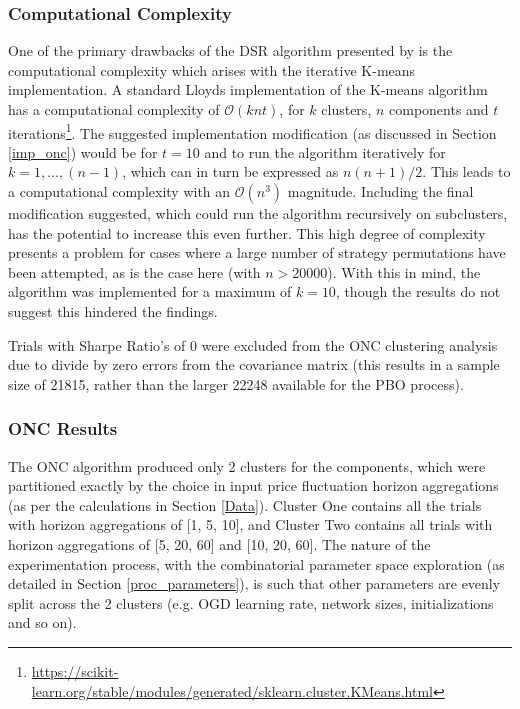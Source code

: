 \documentclass[a4paper,11pt,oneside]{article}
\theoremstyle{plain}
\theoremstyle{definition}
\begin{document}
	\subsubsection{Computational Complexity}
	
	One of the primary drawbacks of the DSR algorithm presented by \citet{PradoDSR} is the computational complexity which arises with the iterative K-means implementation. A standard Lloyds implementation of the K-means algorithm has a computational complexity of $\mathcal{O}(knt)$, for $k$ clusters, $n$ components and $t$ iterations\footnote{\url{https://scikit-learn.org/stable/modules/generated/sklearn.cluster.KMeans.html}}. The suggested implementation modification (as discussed in Section \ref{imp_onc}) would be for $t=10$ and to run the algorithm iteratively for $k=1,...,(n-1)$, which can in turn be expressed as $n(n+1)/2$. This leads to a computational complexity with an $\mathcal{O}(n^3)$ magnitude. Including the final modification suggested, which could run the algorithm recursively on subclusters, has the potential to increase this even further. This high degree of complexity presents a problem for cases where a large number of strategy permutations have been attempted, as is the case here (with $n> 20000$). With this in mind, the algorithm was implemented for a maximum of $k=10$, though the results do not suggest this hindered the findings.\newline
	
	Trials with Sharpe Ratio's of 0 were excluded from the ONC clustering analysis due to divide by zero errors from the covariance matrix (this results in a sample size of 21815, rather than the larger 22248 available for the PBO process).
	
	\subsubsection{ONC Results}\label{results_onc}
	
	The ONC algorithm produced only 2 clusters for the components, which were partitioned exactly by the choice in input price fluctuation horizon aggregations (as per the calculations in Section \ref{Data}). Cluster One contains all the trials with horizon aggregations of [1, 5, 10], and Cluster Two contains all trials with horizon aggregations of [5, 20, 60] and [10, 20, 60]. The nature of the experimentation process, with the combinatorial parameter space exploration (as detailed in Section \ref{proc_parameters}), is such that other parameters are evenly split across the 2 clusters (e.g. OGD learning rate, network sizes, initializations and so on).\newline
	
\end{document}
